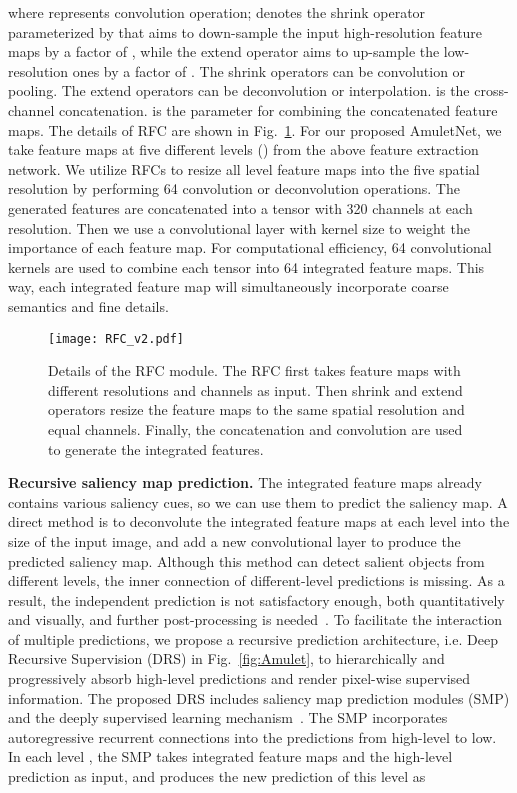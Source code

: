 \documentclass[10pt,twocolumn,letterpaper]{article}
\begin{document}
where  represents convolution operation; denotes the shrink operator parameterized by  that aims to down-sample the input high-resolution feature maps by a factor of , while the extend operator  aims to up-sample the low-resolution ones by a factor of .
The shrink operators can be convolution or pooling. The extend operators can be deconvolution or interpolation.
 is the cross-channel concatenation.
 is the parameter for combining the concatenated feature maps.
The details of RFC are shown in Fig.~\ref{fig:RFC}.
For our proposed AmuletNet, we take feature maps at five different levels () from the above feature extraction network.
We utilize RFCs to resize all level feature maps into the five spatial resolution by performing 64 convolution or deconvolution operations.
The generated features are concatenated into a tensor with 320 channels at each resolution.
Then we use a convolutional layer with  kernel size to weight the importance of each feature map.
For computational efficiency, 64 convolutional kernels are used to combine each tensor into 64 integrated feature maps.
This way, each integrated feature map will simultaneously incorporate coarse semantics and fine details.
\begin{figure}
\begin{center}
\texttt{[image: RFC\_v2.pdf]}
\end{center}
\vspace{-4mm}
\caption{Details of the RFC module. The RFC first takes feature maps with different resolutions and channels as input. Then shrink and extend operators resize the feature maps to the same spatial resolution and equal channels. Finally, the concatenation and  convolution are used to generate the integrated features.}
\label{fig:RFC}
\vspace{-5mm}
\end{figure}
\vspace{-5mm}
{\flushleft \textbf{Recursive saliency map prediction.}}
The integrated feature maps already contains various saliency cues, so we can use them to predict the saliency map.
A direct method is to deconvolute the integrated feature maps at each level into the size of the input image, and add a new convolutional layer to produce the predicted saliency map.
Although this method can detect salient objects from different levels, the inner connection of different-level predictions is missing.
As a result, the independent prediction is not satisfactory enough, both quantitatively and visually, and further
post-processing is needed~\cite{Li2016DeepSaliency,wang2016saliency}.
To facilitate the interaction of multiple predictions, we propose a recursive prediction architecture, i.e. Deep Recursive Supervision (DRS) in Fig.~\ref{fig:Amulet}, to hierarchically and progressively absorb high-level predictions and render pixel-wise supervised information.
The proposed DRS includes saliency map prediction modules (SMP) and the deeply supervised learning mechanism~\cite{xie2015holistically}.
The SMP incorporates autoregressive recurrent connections into the predictions from high-level to low.
In each level , the SMP takes integrated feature maps  and the high-level prediction  as input, and produces the new prediction of this level as
\end{document}
